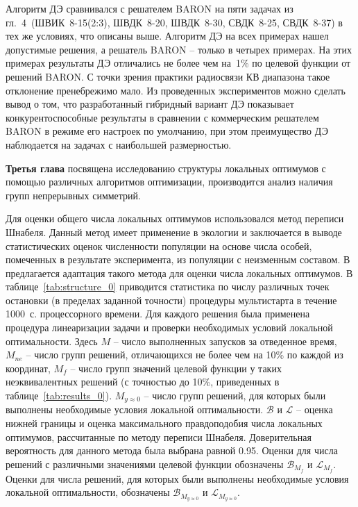 Алгоритм ДЭ сравнивался с решателем BARON на пяти задачах из гл.~4~(ШВИК~8-15(2:3), ШВДК~8-20, ШВДК~8-30, СВДК~8-25, СВДК~8-37) в тех же условиях, что описаны выше. Алгоритм ДЭ на всех примерах нашел допустимые решения, а решатель BARON -- только в четырех примерах. На этих примерах результаты ДЭ отличались не более чем на~1\% по целевой функции от решений BARON. С точки зрения практики радиосвязи КВ диапазона такое отклонение пренебрежимо мало. Из проведенных экспериментов можно сделать вывод о том, что разработанный гибридный вариант ДЭ показывает конкурентоспособные результаты в сравнении с коммерческим решателем BARON в режиме его настроек по умолчанию, при этом преимущество ДЭ наблюдается на задачах с наибольшей размерностью.

{\textbf{Третья глава}} посвящена исследованию структуры локальных оптимумов с помощью различных алгоритмов оптимизации,
производится анализ наличия групп непрерывных симметрий.

Для оценки общего числа локальных оптимумов использовался метод переписи Шнабеля. Данный метод имеет применение в экологии и заключается в
выводе статистических оценок численности популяции на основе числа особей, помеченных в результате эксперимента, из популяции с неизменным
составом. В~ предлагается адаптация такого метода для оценки числа локальных оптимумов. В таблице~\ref{tab:structure_0} приводится статистика по числу различных точек остановки (в пределах заданной точности) процедуры мультистарта в течение 1000~с. процессорного времени. Для каждого решения была применена процедура линеаризации задачи и проверки необходимых условий локальной оптимальности. Здесь {$M$} -- число выполненных запусков за отведенное время, $M_{ne}$ -- число групп решений, отличающихся не более чем на 10\% по каждой из координат, {$M_{f}$} -- число групп значений целевой функции у таких неэквивалентных решений (с точностью до 10\%, приведенных в таблице~\ref{tab:results_0}). {$M_{y\approx0}$} -- число групп решений, для которых были выполнены необходимые условия локальной оптимальности. $\mathcal{B}$ и $\mathcal{L}$ -- оценка нижней границы и оценка максимального правдоподобия числа локальных оптимумов, рассчитанные по методу переписи Шнабеля. Доверительная вероятность для данного метода была выбрана равной 0.95. Оценки для числа решений с различными значениями целевой функции обозначены $\mathcal{B}_{M_f}$ и $\mathcal{L}_{M_f}$. Оценки для числа решений, для которых были выполнены необходимые условия локальной оптимальности, обозначены $\mathcal{B}_{M_{y\approx0}}$ и $\mathcal{L}_{M_{y\approx0}}$.


